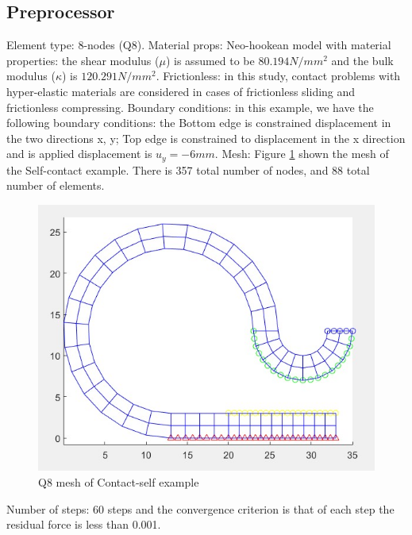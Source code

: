 \newpage
\subsection{Preprocessor}
Element type: 8-nodes (Q8).
\vspace{0.38cm}
\newline
Material props: Neo-hookean model with material properties: the shear modulus ($\mu$) is assumed to 
be $80.194 N/mm^2$ and the bulk modulus ($\kappa$) is $120.291 N/mm^2$.
\vspace{0.38cm} \newline
Frictionless: in this study, contact problems with hyper-elastic materials are
considered in cases of frictionless sliding and frictionless compressing.
\vspace{0.38cm} \newline
Boundary conditions: in this example, we have the following boundary conditions: the Bottom edge is 
constrained displacement in the two directions x, y; Top edge is constrained to displacement in the 
x direction and is applied displacement is $u_y = - 6 mm$.
\vspace{0.38cm} \newline
Mesh: Figure \ref{fig:contactself_mesh_Q8} shown the mesh of the Self-contact example.
There is 357 total number of nodes, and 88 total number of elements.
\begin{figure}[H]
    \centering
    \includegraphics[scale=1]{Figures/contactself_mesh_Q8.jpg}
    \decoRule   
    \caption{Q8 mesh of Contact-self example}
    \label{fig:contactself_mesh_Q8}
\end{figure} \noindent \noindent
Number of steps: 60 steps and the convergence criterion is that of each step the residual force is less than 0.001.
\newpage

